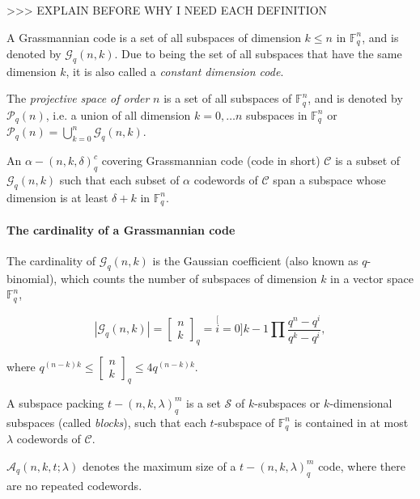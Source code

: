 >\textcompwordmark >\textcompwordmark > EXPLAIN BEFORE WHY I NEED
EACH DEFINITION
\begin{defn}
 A Grassmannian code is a set of all subspaces of dimension $k\leq n$
in $\ensuremath{\mathbb{F}}_{q}^{n}$, and is denoted by $\mathcal{G}_{q}\left(n,k\right)$.
Due to being the set of all subspaces that have the same dimension
$k$, it is also called a \textit{constant dimension code}. \cite{Zhang:2019}
\end{defn}
%
\begin{defn}
 The \textit{projective space of order} $n$ is a set of all subspaces
of $\ensuremath{\mathbb{F}}_{q}^{n}$, and is denoted by $\mathcal{P}_{q}\left(n\right)$,
i.e. a union of all dimension $k=0,\ldots n$ subspaces in $\ensuremath{\mathbb{F}}_{q}^{n}$
or $\mathcal{P}_{q}\left(n\right)=\bigcup_{k=0}^{n}\mathcal{G}_{q}\left(n,k\right)$.
\cite{Wachter-Zeh:2018}
\end{defn}
%
\begin{defn}
 An $\alpha-\left(n,k,\delta\right)_{q}^{c}$ covering Grassmannian
code (code in short) $\mathcal{C}$ is a subset of $\mathcal{G}_{q}\left(n,k\right)$
such that each subset of $\alpha$ codewords of $\mathcal{C}$ span
a subspace whose dimension is at least $\delta+k$ in $\ensuremath{\mathbb{F}}_{q}^{n}$.
\cite{Zhang:2019}
\end{defn}

\paragraph{The cardinality of a Grassmannian code}

The cardinality of $\mathcal{G}_{q}\left(n,k\right)$ is the Gaussian
coefficient (also known as $q$-binomial), which counts the number
of subspaces of dimension $k$ in a vector space $\ensuremath{\mathbb{F}}_{q}^{n}$,

\[
\left|\mathcal{G}_{q}\left(n,k\right)\right|=\left[\begin{array}{c}
n\\
k
\end{array}\right]_{q}=\stackrel[i=0]{k-1}{\prod}\frac{q^{n}-q^{i}}{q^{k}-q^{i}},
\]

where $q^{\left(n-k\right)k}\leq\left[\begin{array}{c}
n\\
k
\end{array}\right]_{q}\leq4q^{\left(n-k\right)k}$.

\begin{defn}
 A subspace packing $t-\left(n,k,\lambda\right)_{q}^{m}$ is a set
$\mathcal{S}$ of $k$-subspaces or $k$-dimensional subspaces (called
\textit{blocks}), such that each $t$-subspace of $\ensuremath{\mathbb{F}}_{q}^{n}$
is contained in at most $\lambda$ codewords of $\mathcal{C}$. \cite{Etzion:2018}
\end{defn}
%
\begin{defn}
$\mathcal{A}_{q}\left(n,k,t;\lambda\right)$ denotes the maximum size
of a $t-\left(n,k,\lambda\right)_{q}^{m}$ code, where there are no
repeated codewords. \cite{Etzion:2018}
\end{defn}

